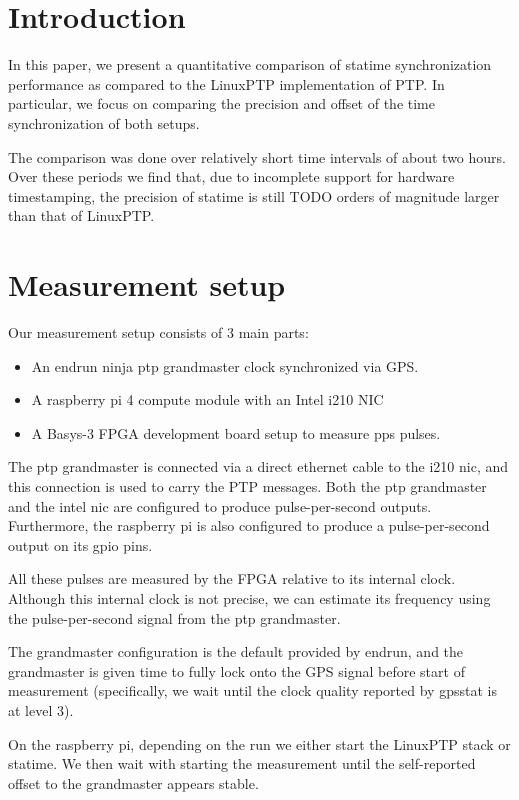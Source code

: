 \documentclass{article}
\begin{document}
\section{Introduction}

In this paper, we present a quantitative comparison of statime synchronization performance as compared to the LinuxPTP implementation of PTP. In particular, we focus on comparing the precision and offset of the time synchronization of both setups.

The comparison was done over relatively short time intervals of about two hours. Over these periods we find that, due to incomplete support for hardware timestamping, the precision of statime is still TODO orders of magnitude larger than that of LinuxPTP.

\section{Measurement setup}

Our measurement setup consists of 3 main parts:
\begin{itemize}
    \item An endrun ninja ptp grandmaster clock synchronized via GPS.
    \item A raspberry pi 4 compute module with an Intel i210 NIC
    \item A Basys-3 FPGA development board setup to measure pps pulses.
\end{itemize}

The ptp grandmaster is connected via a direct ethernet cable to the i210 nic, and this connection is used to carry the PTP messages. Both the ptp grandmaster and the intel nic are configured to produce pulse-per-second outputs. Furthermore, the raspberry pi is also configured to produce a pulse-per-second output on its gpio pins.

All these pulses are measured by the FPGA relative to its internal clock. Although this internal clock is not precise, we can estimate its frequency using the pulse-per-second signal from the ptp grandmaster.

The grandmaster configuration is the default provided by endrun, and the grandmaster is given time to fully lock onto the GPS signal before start of measurement (specifically, we wait until the clock quality reported by gpsstat is at level 3).

On the raspberry pi, depending on the run we either start the LinuxPTP stack or statime. We then wait with starting the measurement until the self-reported offset to the grandmaster appears stable.
\end{document}
